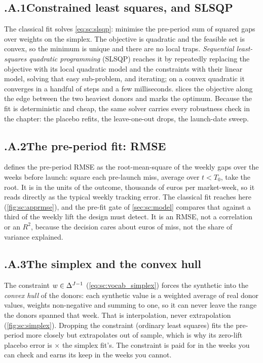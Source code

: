 \subsection*{\thechapter.A.1\quad Constrained least squares, and SLSQP}
\label{app:sc:slsqp}
The classical fit solves \cref{eq:sc:slsqp}: minimise the pre-period sum of squared gaps over weights
on the simplex. The objective is quadratic and the feasible set is convex, so the minimum is unique
and there are no local traps. \emph{Sequential least-squares quadratic programming} (SLSQP) reaches it
by repeatedly replacing the objective with its local quadratic model and the constraints with their
linear model, solving that easy sub-problem, and iterating; on a convex quadratic it converges in a
handful of steps and a few milliseconds.  slices the objective along the edge
between the two heaviest donors and marks the optimum. Because the fit is deterministic and cheap, the
same solver carries every robustness check in the chapter: the placebo refits, the leave-one-out
drops, the launch-date sweep.


\subsection*{\thechapter.A.2\quad The pre-period fit: RMSE}
\label{app:sc:rmse}
 defines the pre-period RMSE as the root-mean-square of the weekly gaps over the
weeks before launch: square each pre-launch miss, average over $t < T_0$, take the root. It is in the
units of the outcome, thousands of euros per market-week, so it reads directly as the typical weekly
tracking error. The classical fit reaches \keur{\nbSevenClPreRmse} here (\cref{fig:sc:apprmse}), and
the pre-fit gate of \cref{sec:sc:model} compares that against a third of the weekly lift the design
must detect. It is an RMSE, not a correlation or an $R^2$, because the decision cares about euros of
miss, not the share of variance explained.


\subsection*{\thechapter.A.3\quad The simplex and the convex hull}
\label{app:sc:simplex}
The constraint $w \in \Delta^{J-1}$ (\cref{eq:sc:vocab_simplex}) forces the synthetic into the
\emph{convex hull} of the donors: each synthetic value is a weighted average of real donor values,
weights non-negative and summing to one, so it can never leave the range the donors spanned that week.
That is interpolation, never extrapolation (\cref{fig:sc:simplex}). Dropping the constraint (ordinary
least squares) fits the pre-period more closely but extrapolates out of sample, which is why its
zero-lift placebo error is \nbSevenHullOosRatio$\times$ the simplex fit's. The constraint is paid for
in the weeks you can check and earns its keep in the weeks you cannot.

